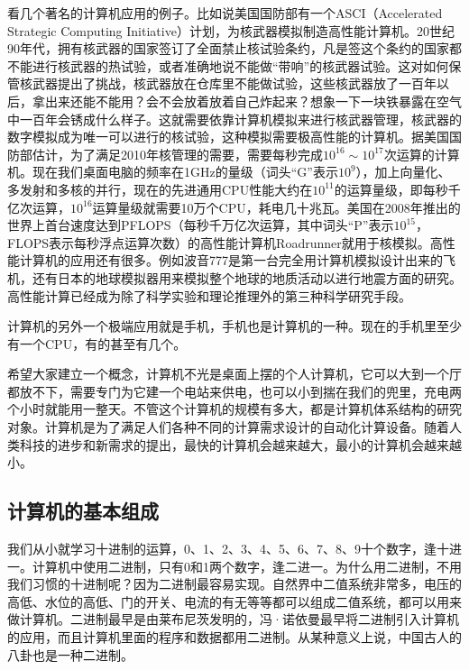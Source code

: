 \documentclass[]{ctexbook}
\begin{document}
看几个著名的计算机应用的例子。比如说美国国防部有一个ASCI（Accelerated Strategic Computing Initiative）计划，为核武器模拟制造高性能计算机。20世纪90年代，拥有核武器的国家签订了全面禁止核试验条约，凡是签这个条约的国家都不能进行核武器的热试验，或者准确地说不能做``带响''的核武器试验。这对如何保管核武器提出了挑战，核武器放在仓库里不能做试验，这些核武器放了一百年以后，拿出来还能不能用？会不会放着放着自己炸起来？想象一下一块铁暴露在空气中一百年会锈成什么样子。这就需要依靠计算机模拟来进行核武器管理，核武器的数字模拟成为唯一可以进行的核试验，这种模拟需要极高性能的计算机。据美国国防部估计，为了满足2010年核管理的需要，需要每秒完成\(10^{16}\sim{}10^{17}\)次运算的计算机。现在我们桌面电脑的频率在1GHz的量级（词头``G''表示\(10^9\)），加上向量化、多发射和多核的并行，现在的先进通用CPU性能大约在\(10^{11}\)的运算量级，即每秒千亿次运算，\(10^{16}\)运算量级就需要10万个CPU，耗电几十兆瓦。美国在2008年推出的世界上首台速度达到PFLOPS（每秒千万亿次运算，其中词头``P''表示\(10^{15}\)，FLOPS表示每秒浮点运算次数）的高性能计算机Roadrunner就用于核模拟。高性能计算机的应用还有很多。例如波音777是第一台完全用计算机模拟设计出来的飞机，还有日本的地球模拟器用来模拟整个地球的地质活动以进行地震方面的研究。高性能计算已经成为除了科学实验和理论推理外的第三种科学研究手段。

计算机的另外一个极端应用就是手机，手机也是计算机的一种。现在的手机里至少有一个CPU，有的甚至有几个。

希望大家建立一个概念，计算机不光是桌面上摆的个人计算机，它可以大到一个厅都放不下，需要专门为它建一个电站来供电，也可以小到揣在我们的兜里，充电两个小时就能用一整天。不管这个计算机的规模有多大，都是计算机体系结构的研究对象。计算机是为了满足人们各种不同的计算需求设计的自动化计算设备。随着人类科技的进步和新需求的提出，最快的计算机会越来越大，最小的计算机会越来越小。

\hypertarget{ux8ba1ux7b97ux673aux7684ux57faux672cux7ec4ux6210}{%
\subsection{计算机的基本组成}\label{ux8ba1ux7b97ux673aux7684ux57faux672cux7ec4ux6210}}

我们从小就学习十进制的运算，0、1、2、3、4、5、6、7、8、9十个数字，逢十进一。计算机中使用二进制，只有0和1两个数字，逢二进一。为什么用二进制，不用我们习惯的十进制呢？因为二进制最容易实现。自然界中二值系统非常多，电压的高低、水位的高低、门的开关、电流的有无等等都可以组成二值系统，都可以用来做计算机。二进制最早是由莱布尼茨发明的，冯·诺依曼最早将二进制引入计算机的应用，而且计算机里面的程序和数据都用二进制。从某种意义上说，中国古人的八卦也是一种二进制。
\end{document}
